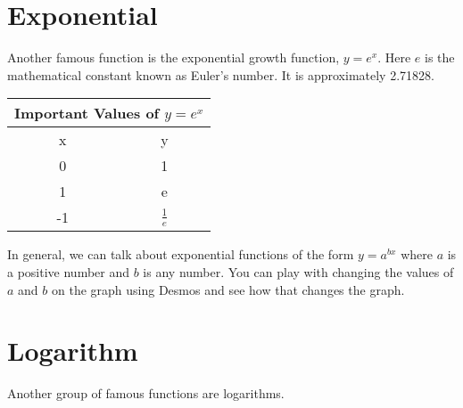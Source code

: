 \documentclass{ximera}
\begin{document}

\section{Exponential}
Another famous function is the exponential growth function, $y=e^x$.  Here $e$ is the mathematical constant known as Euler's number.  It is approximately 2.71828.


\begin{tabular}{ |c || c|  }
 \hline
 \multicolumn{2}{|c|}{Important Values of $y=e^x$} \\
\hline
 \hline
 x & y\\
 \hline
 0&1\\
 1&e\\
 -1&$\frac{1}{e}$\\
 \hline
\end{tabular}

In general, we can talk about exponential functions of the form $y=a^{bx}$ where $a$ is a positive number and $b$ is any number.  You can play with changing the values of $a$ and $b$ on the graph using Desmos and see how that changes the graph.  

\begin{center}  
\end{center}




\section{Logarithm}
Another group of famous functions are logarithms.
\end{document}
